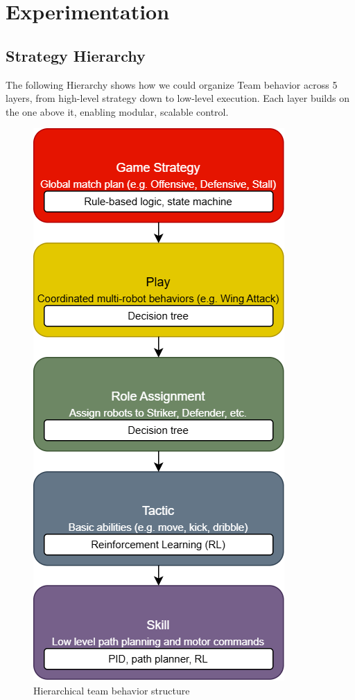 \section{Experimentation}

\subsection{Strategy Hierarchy}
The following Hierarchy shows how we could organize Team behavior across 5 layers, from high-level strategy down to low-level execution. Each layer builds on the one above it, enabling modular, scalable control.

\begin{figure}[h]
    \centering
    \includegraphics[width=0.8\linewidth]{../StrategyHierarchy.png}
    \caption{Hierarchical team behavior structure}
    \label{fig:strategy_hierarchy}
\end{figure}

